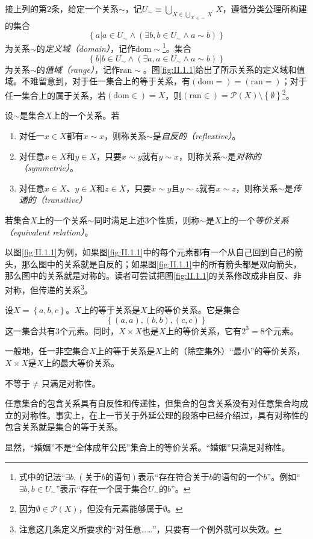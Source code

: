 \documentclass[../main.tex]{subfiles}
\begin{document}
接上列的第2条，给定一个关系$\sim$，记$U_\sim\equiv\bigcup_{X\in\bigcup_{X^\prime\in\sim}X^\prime}X$，遵循分类公理所构建的集合
\[
    \left\{a|a\in U_\sim\wedge\left(\exists b,b\in U_\sim\wedge a\sim b\right)\right\}
\]
为关系$\sim$的\emph{定义域（domain）}，记作$\mathrm{dom}\sim$\footnote{式中的记法“$\exists b,\left(\text{关于$b$的语句}\right)$表示“存在符合关于$b$的语句的一个$b$”。例如“$\exists b,b\in U_\sim$”表示“存在一个属于集合$U_\sim$的$b$”。}。集合
\[
    \left\{b|b\in U_\sim\wedge \left(\exists a,a\in U_\sim\wedge a\sim b\right)\right\}
\]
为关系$\sim$的\emph{值域（range）}，记作$\mathrm{ran}\sim$。图\ref{fig:II.1.1}给出了所示关系的定义域和值域。不难留意到，对于任一集合上的等于关系，有$\left(\mathrm{dom}=\right)=\left(\mathrm{ran}=\right)$；对于任一集合上的属于关系，若$\left(\mathrm{dom}\in\right)=X$，则$\left(\mathrm{ran}\in\right)=\mathcal{P}\left(X\right)\setminus\left\{\emptyset\right\}$\footnote{因为$\emptyset\in\mathcal{P}\left(X\right)$，但没有元素能够属于$\emptyset$。}。

\begin{definition}\label{def:II.1.2}
    设$\sim$是集合$X$上的一个关系。若
    \begin{enumerate}
        \item 对任一$x\in X$都有$x\sim x$，则称关系$\sim$是\emph{自反的（reflextive）}。
        \item 对任意$x\in X$和$y\in X$，只要$x\sim y$就有$y\sim x$，则称关系$\sim$是\emph{对称的（symmetric）}。
        \item 对任意$x\in X$、$y\in X$和$z\in X$，只要$x\sim y\text{且}y\sim z$就有$x\sim z$，则称关系$\sim$是\emph{传递的（transitive）}
    \end{enumerate}
    若集合$X$上的一个关系$\sim$同时满足上述3个性质，则称$\sim$是$X$上的一个\emph{等价关系（equivalent relation）}。
\end{definition}

以图\ref{fig:II.1.1}为例，如果图\ref{fig:II.1.1}中的每个元素都有一个从自己回到自己的箭头，那么图中的关系就是自反的；如果图\ref{fig:II.1.1}中的所有箭头都是双向箭头，那么图中的关系就是对称的。读者可尝试把图\ref{fig:II.1.1}的关系修改成非自反、非对称，但传递的关系\footnote{注意这几条定义所要求的“对任意……”，只要有一个例外就可以失效。}。

\begin{example}
    设$X=\left\{a,b,c\right\}$。$X$上的等于关系是$X$上的等价关系。它是集合
    \[
        \left\{\left(a,a\right),\left(b,b\right),\left(c,c\right)\right\}
    \]
    这一集合共有3个元素。同时，$X\times X$也是$X$上的等价关系，它有$2^3=8$个元素。

    一般地，任一非空集合$X$上的等于关系是$X$上的（除空集外）“最小”的等价关系，$X\times X$是$X$上的最大等价关系。

    不等于$\neq$只满足对称性。

    任意集合的包含关系具有自反性和传递性，但集合的包含关系没有对任意集合均成立的对称性。事实上，在上一节关于外延公理的段落中已经介绍过，具有对称性的包含关系就是集合的等于关系。

    显然，“婚姻”不是“全体成年公民”集合上的等价关系。“婚姻”只满足对称性。
\end{example}
\end{document}
